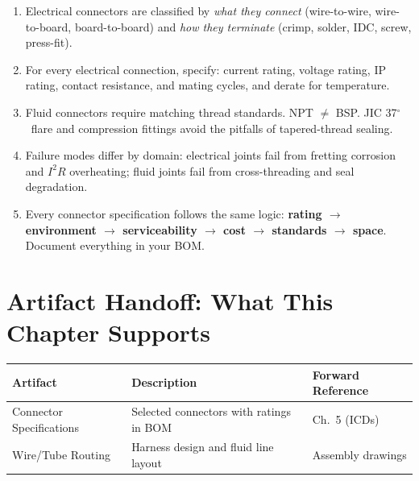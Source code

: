 \begin{keyconceptbox}
\begin{enumerate}[nosep,leftmargin=1.5em]
  \item Electrical connectors are classified by \emph{what they connect} (wire-to-wire, wire-to-board, board-to-board) and \emph{how they terminate} (crimp, solder, IDC, screw, press-fit).
  \item For every electrical connection, specify: current rating, voltage rating, IP rating, contact resistance, and mating cycles, and derate for temperature.
  \item Fluid connectors require matching thread standards. NPT $\neq$ BSP. JIC 37$^{\circ}$\ flare and compression fittings avoid the pitfalls of tapered-thread sealing.
  \item Failure modes differ by domain: electrical joints fail from fretting corrosion and $I^2R$ overheating; fluid joints fail from cross-threading and seal degradation.
  \item Every connector specification follows the same logic: \textbf{rating $\to$ environment $\to$ serviceability $\to$ cost $\to$ standards $\to$ space}. Document everything in your BOM.
\end{enumerate}
\end{keyconceptbox}


\section{Artifact Handoff: What This Chapter Supports}
\begin{table}[htbp]\centering\small
\begin{tabularx}{\textwidth}{l X l}
\toprule
\textbf{Artifact} & \textbf{Description} & \textbf{Forward Reference} \\
\midrule
Connector Specifications & Selected connectors with ratings in BOM & Ch.~5 (ICDs) \\
Wire/Tube Routing & Harness design and fluid line layout & Assembly drawings \\
\bottomrule
\end{tabularx}
\end{table}


